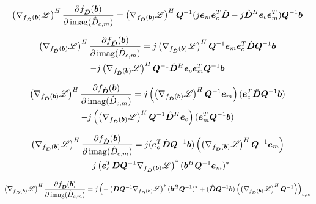 \begin{appendices}
\begin{equation}
\left(\nabla_{f_{\hat{\bm{D}}}(\bm{b})} \mathscr{L}\right)^H\frac{\partial f_{\hat{\bm{D}}}(\bm{b})}{\partial \operatorname{imag}(\hat{D}_{c,m})} = \left(\nabla_{f_{\hat{\bm{D}}}(\bm{b})} \mathscr{L}\right)^H\bm{Q}^{-1}(j\bm{e}_m\bm{e}_c^T\hat{\bm{D}} - j\hat{\bm{D}}^H\bm{e}_c\bm{e}_m^T)\bm{Q}^{-1}\bm{b}
\end{equation}

\begin{multline}
\left(\nabla_{f_{\hat{\bm{D}}}(\bm{b})} \mathscr{L}\right)^H\frac{\partial f_{\hat{\bm{D}}}(\bm{b})}{\partial \operatorname{imag}(\hat{D}_{c,m})} = j\left(\nabla_{f_{\hat{\bm{D}}}(\bm{b})} \mathscr{L}\right)^H\bm{Q}^{-1}\bm{e}_m\bm{e}_c^T\hat{\bm{D}}\bm{Q}^{-1}\bm{b} \\- j\left(\nabla_{f_{\hat{\bm{D}}}(\bm{b})} \mathscr{L}\right)^H\bm{Q}^{-1}\hat{\bm{D}}^H\bm{e}_c\bm{e}_m^T\bm{Q}^{-1}\bm{b}
\end{multline}

\begin{multline}
\left(\nabla_{f_{\hat{\bm{D}}}(\bm{b})} \mathscr{L}\right)^H\frac{\partial f_{\hat{\bm{D}}}(\bm{b})}{\partial \operatorname{imag}(\hat{D}_{c,m})} = j\left(\left(\nabla_{f_{\hat{\bm{D}}}(\bm{b})} \mathscr{L}\right)^H\bm{Q}^{-1}\bm{e}_m\right)(\bm{e}_c^T\hat{\bm{D}}\bm{Q}^{-1}\bm{b}) \\- j\left(\left(\nabla_{f_{\hat{\bm{D}}}(\bm{b})} \mathscr{L}\right)^H\bm{Q}^{-1}\hat{\bm{D}}^H\bm{e}_c\right)(\bm{e}_m^T\bm{Q}^{-1}\bm{b})
\end{multline}

\begin{multline}
\left(\nabla_{f_{\hat{\bm{D}}}(\bm{b})} \mathscr{L}\right)^H\frac{\partial f_{\hat{\bm{D}}}(\bm{b})}{\partial \operatorname{imag}(\hat{D}_{c,m})} = j(\bm{e}_c^T\hat{\bm{D}}\bm{Q}^{-1}\bm{b})\left(\left(\nabla_{f_{\hat{\bm{D}}}(\bm{b})} \mathscr{L}\right)^H\bm{Q}^{-1}\bm{e}_m\right) \\- j\left(\bm{e}_c^T\bm{D}\bm{Q}^{-1}\nabla_{f_{\hat{\bm{D}}}(\bm{b})} \mathscr{L}\right)^*(\bm{b}^H\bm{Q}^{-1}\bm{e}_m)^*
\end{multline}


\begin{equation}
\left(\nabla_{f_{\hat{\bm{D}}}(\bm{b})} \mathscr{L}\right)^H\frac{\partial f_{\hat{\bm{D}}}(\bm{b})}{\partial \operatorname{imag}(\hat{D}_{c,m})} = j\left(-\left(\bm{D}\bm{Q}^{-1}\nabla_{f_{\hat{\bm{D}}}(\bm{b})} \mathscr{L}\right)^*(\bm{b}^H\bm{Q}^{-1})^* + (\hat{\bm{D}}\bm{Q}^{-1}\bm{b})\left(\left(\nabla_{f_{\hat{\bm{D}}}(\bm{b})} \mathscr{L}\right)^H\bm{Q}^{-1}\right)\right)_{c,m}
\end{equation}




\end{appendices}
